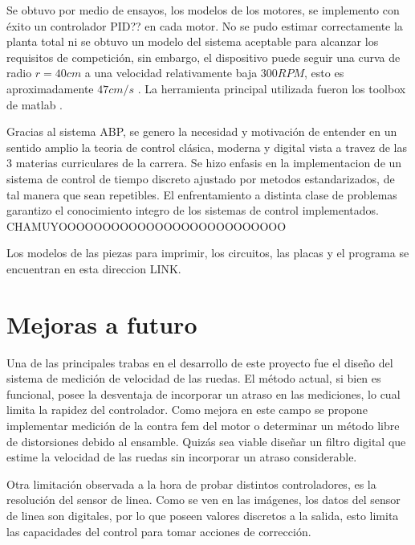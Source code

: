 \documentclass[10pt,conference,a4paper,onecolumn]{article}%
\begin{document}
Se obtuvo por medio de ensayos, los modelos de los motores, se implemento con éxito un controlador PID?? en cada motor. No se pudo estimar correctamente la planta total ni se obtuvo un modelo del sistema aceptable para alcanzar los requisitos de competición, sin embargo, el dispositivo puede seguir una curva de radio $r=40cm$ a una velocidad relativamente baja $300RPM$, esto es aproximadamente $47cm/s$ . La herramienta principal utilizada fueron los toolbox de matlab \cite{Sys_ident,PID_tuner}.



Gracias al sistema ABP, se genero la necesidad y motivación de entender en un sentido amplio  la teoria de control clásica, moderna y digital vista a travez de las 3 materias curriculares de la carrera. Se hizo enfasis en la implementacion de un sistema de control de tiempo discreto ajustado por metodos estandarizados, de tal manera que sean repetibles. El enfrentamiento a distinta clase de problemas garantizo el conocimiento integro de los sistemas de control implementados. CHAMUYOOOOOOOOOOOOOOOOOOOOOOOOOO 
 
Los modelos de las piezas para imprimir, los circuitos, las placas y el programa se encuentran en esta direccion LINK.

  


\section{Mejoras a futuro}
Una de las principales trabas en el desarrollo de este proyecto fue el diseño del sistema de medición de velocidad de las ruedas. El método actual, si bien es funcional, posee la desventaja de incorporar un atraso en las mediciones, lo cual limita la rapidez del controlador. Como mejora en este campo se propone implementar medición de la contra fem del motor o determinar un método libre de distorsiones debido al ensamble. Quizás sea viable diseñar un filtro digital que estime la velocidad de las ruedas sin incorporar un atraso considerable. 

Otra limitación observada a la hora de probar distintos controladores, es la resolución del sensor de linea. Como se ven en las imágenes, los datos del sensor de linea son digitales, por lo que poseen valores discretos a la salida, esto limita las capacidades del control para tomar acciones de corrección.
\end{document}
